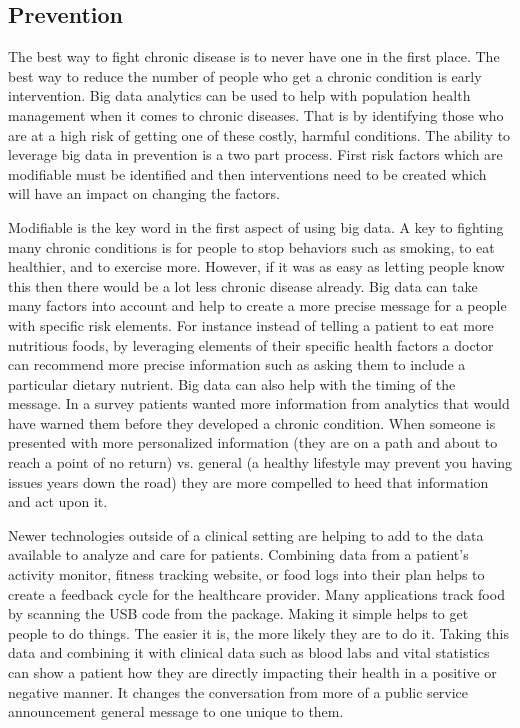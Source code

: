 \documentclass[sigconf]{acmart}
\begin{document}
\subsection{Prevention}
The best way to fight chronic disease is to never have one in the first 
place.  The best way to reduce the number of people who get a chronic 
condition is early intervention.  Big data analytics can be used to help 
with population health management when it comes to chronic diseases.  
That is by identifying those who are at a high risk of getting one of 
these costly, harmful conditions\cite{HITAnalyticsHow}.  The ability 
to leverage big data in prevention is a two part process.  First risk 
factors which are modifiable must be identified and then interventions 
need to be created which will have an impact on changing the 
factors\cite{Liebertpub}.  

Modifiable is the key word in the first aspect of using big data.  A key 
to fighting many chronic conditions is for people to stop behaviors such 
as smoking, to eat healthier, and to exercise more.  However, if it was 
as easy as letting people know this then there would be a lot less chronic 
disease already.  Big data can take many factors into account and help 
to create a more precise message for a people with specific risk 
elements.  For instance instead of telling a patient to eat more 
nutritious foods, by leveraging elements of their specific health factors 
a doctor can recommend more precise information such as asking them to 
include a particular dietary nutrient\cite{Liebertpub}.  Big data can also 
help with the timing of the message.  In a survey patients wanted more 
information from analytics that would have warned them before they 
developed a chronic condition\cite{HITAnalyticsChronic}.  When someone 
is presented with more personalized information (they are on a path and 
about to reach a point of no return) vs. general (a healthy lifestyle 
may prevent you having issues years down the road) they are more 
compelled to heed that information and act upon it.  

Newer technologies outside of a clinical setting are helping to add to 
the data available to analyze and care for patients.  Combining data 
from a patient's activity monitor, fitness tracking website, or food logs 
into their plan helps to create a feedback cycle for the healthcare 
provider.  Many applications track food by scanning the USB code from 
the package.  Making it simple helps to get people to do things.  The 
easier it is, the more likely they are to do it.  Taking this data and 
combining it with clinical data such as blood labs and vital statistics 
can show a patient how they are directly impacting their health in a 
positive or negative manner.  It changes the conversation from more of 
a public service announcement general message to one unique to them.
\end{document}
